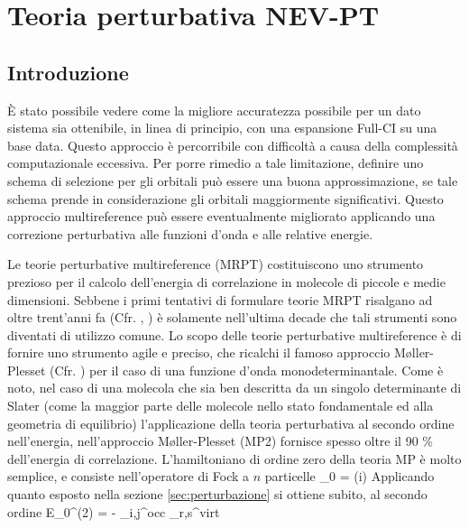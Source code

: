 \chapter{Teoria perturbativa NEV-PT}

\section{Introduzione}

\`E stato possibile vedere come la migliore accuratezza possibile per
un dato sistema sia ottenibile, in linea di principio, con una espansione
Full-CI su una base data. Questo approccio \`e percorribile con difficolt\`a 
a causa della complessit\`a computazionale eccessiva. Per porre
rimedio a tale limitazione, definire uno schema di selezione per gli orbitali
pu\`o essere una buona approssimazione, se tale schema prende in
considerazione gli orbitali maggiormente significativi.
Questo approccio multireference pu\`o essere eventualmente migliorato 
applicando una correzione perturbativa alle funzioni d'onda e alle relative
energie.

Le teorie perturbative multireference (MRPT) costituiscono uno strumento
prezioso per il calcolo dell'energia di correlazione in molecole di piccole
e medie dimensioni. Sebbene i primi tentativi di formulare teorie MRPT
risalgano ad oltre trent'anni fa (Cfr. \cite{rmp-39-1967-771},
\cite{jcp-58-1973-5745}) \`e solamente nell'ultima decade che tali strumenti
sono diventati di utilizzo comune. Lo scopo delle teorie perturbative
multireference \`e di fornire uno strumento agile e preciso, che ricalchi il
famoso approccio M{\o}ller-Plesset (Cfr. \cite{pr-46-1934-618}) per il caso
di una funzione d'onda monodeterminantale.
Come \`e noto, nel caso di una molecola che sia ben descritta da un singolo
determinante di Slater (come la maggior parte delle molecole nello stato
fondamentale ed alla geometria di equilibrio) l'applicazione della teoria
perturbativa al secondo ordine nell'energia, nell'approccio
M{\o}ller-Plesset (MP2) fornisce spesso oltre il 90 \% dell'energia di
correlazione.
L'hamiltoniano di ordine zero della teoria MP \`e molto semplice, e consiste
nell'operatore di Fock a $n$ particelle
\beq
\ham_0 =  \fock(i)
\eeq
Applicando quanto esposto nella sezione \ref{sec:perturbazione} si ottiene
subito, al secondo ordine
\beq
E_0^{(2)} = - \sum_{i,j}^{\mbox{occ}} \sum_{r,s}^{\mbox{virt}} 
\eeq

